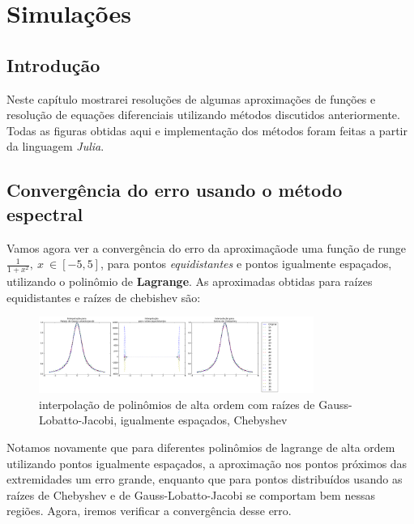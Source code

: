 \chapter{Simulações}
\label{cap:III}
\section{Introdução}
 Neste capítulo mostrarei resoluções de algumas aproximações de funções e resolução de equações diferenciais utilizando métodos discutidos anteriormente. Todas as figuras obtidas aqui e implementação dos métodos foram feitas a partir da linguagem \emph{Julia}.

\section{Convergência do erro usando o método espectral}
	Vamos agora ver a convergência do erro da aproximaçãode uma função de runge $\frac{1}{1+x^2},\ x\ \in [-5,5]$, para pontos \emph{equidistantes} e pontos igualmente espaçados, utilizando o polinômio de \textbf{Lagrange}.
	As aproximadas obtidas para raízes equidistantes e raízes de chebishev são:\\	
\begin{figure}[!ht]
  \includegraphics[width=0.8\textwidth,center]{figuras/interpolacao_todas.png}
  \caption{interpolação de polinômios de alta ordem com raízes de Gauss-Lobatto-Jacobi, igualmente espaçados, Chebyshev}
\end{figure}
Notamos novamente que para diferentes  polinômios de lagrange de alta ordem utilizando pontos igualmente espaçados, a aproximação nos pontos próximos das extremidades um erro  grande, enquanto que para pontos distribuídos usando as raízes de Chebyshev e de Gauss-Lobatto-Jacobi se comportam bem nessas regiões. Agora, iremos verificar a convergência desse erro.

